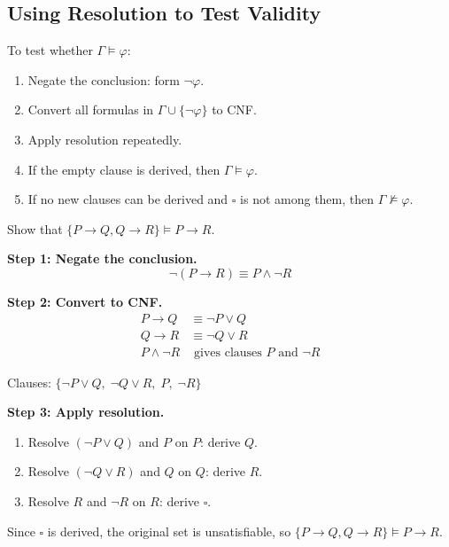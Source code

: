 \subsection{Using Resolution to Test Validity}

\begin{remark}
To test whether $\Gamma \models \varphi$:
\begin{enumerate}
  \item Negate the conclusion: form $\neg\varphi$.
  \item Convert all formulas in $\Gamma \cup \{\neg\varphi\}$ to CNF.
  \item Apply resolution repeatedly.
  \item If the empty clause is derived, then $\Gamma \models \varphi$.
  \item If no new clauses can be derived and $\square$ is not among them, then
        $\Gamma \not\models \varphi$.
\end{enumerate}
\end{remark}

\begin{example}
Show that $\{P \rightarrow Q, Q \rightarrow R\} \models P \rightarrow R$.

\textbf{Step 1: Negate the conclusion.}
\[
\neg(P \rightarrow R) \equiv P \wedge \neg R
\]

\textbf{Step 2: Convert to CNF.}
\begin{align*}
P \rightarrow Q &\equiv \neg P \vee Q \\
Q \rightarrow R &\equiv \neg Q \vee R \\
P \wedge \neg R &\text{ gives clauses } P \text{ and } \neg R
\end{align*}

Clauses: $\{\neg P \vee Q, \; \neg Q \vee R, \; P, \; \neg R\}$

\textbf{Step 3: Apply resolution.}
\begin{enumerate}
  \item Resolve $(\neg P \vee Q)$ and $P$ on $P$: derive $Q$.
  \item Resolve $(\neg Q \vee R)$ and $Q$ on $Q$: derive $R$.
  \item Resolve $R$ and $\neg R$ on $R$: derive $\square$.
\end{enumerate}

Since $\square$ is derived, the original set is unsatisfiable, so
$\{P \rightarrow Q, Q \rightarrow R\} \models P \rightarrow R$.
\end{example}

